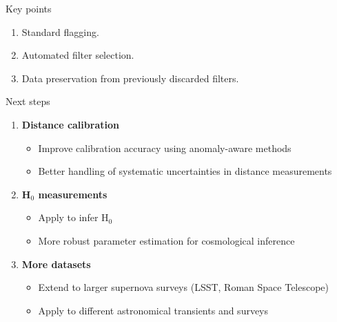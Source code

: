 \documentclass[aspectratio=169]{beamer}
\begin{document}
\begin{frame}{Key points}
  \begin{enumerate}
    \item Standard flagging.
    \item Automated filter selection.
    \item Data preservation from previously discarded filters.
  \end{enumerate}
\end{frame}

\begin{frame}{Next steps}
  \begin{enumerate}
    \item \textbf{Distance calibration}
      \begin{itemize}
        \item Improve calibration accuracy using anomaly-aware methods
        \item Better handling of systematic uncertainties in distance measurements
      \end{itemize}
    \item \textbf{H$_0$ measurements}
      \begin{itemize}
        \item Apply to infer H$_0$ 
        \item More robust parameter estimation for cosmological inference
      \end{itemize}
    \item \textbf{More datasets}
      \begin{itemize}
        \item Extend to larger supernova surveys (LSST, Roman Space Telescope)
        \item Apply to different astronomical transients and surveys
      \end{itemize}
  \end{enumerate}
\end{frame}


%     
\end{document}
